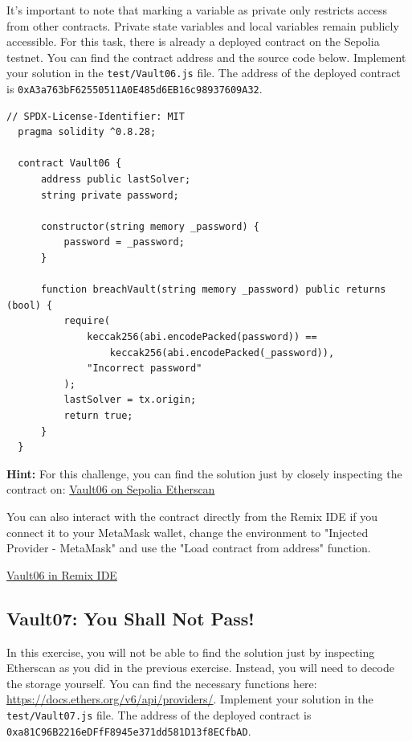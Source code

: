 \documentclass[12pt]{article}
\begin{document}
\noindent
It's important to note that marking a variable as private only restricts access from other contracts. Private state variables and local variables remain publicly accessible. For this task, there is already a deployed contract on the Sepolia testnet. You can find the contract address and the source code below. Implement your solution in the \texttt{test/Vault06.js} file. The address of the deployed contract is \texttt{0xA3a763bF62550511A0E485d6EB16c98937609A32}.

\begin{lstlisting}[language=Solidity]
  // SPDX-License-Identifier: MIT
  pragma solidity ^0.8.28;
  
  contract Vault06 {
      address public lastSolver;
      string private password;
  
      constructor(string memory _password) {
          password = _password;
      }
  
      function breachVault(string memory _password) public returns (bool) {
          require(
              keccak256(abi.encodePacked(password)) ==
                  keccak256(abi.encodePacked(_password)),
              "Incorrect password"
          );
          lastSolver = tx.origin;
          return true;
      }
  }
\end{lstlisting}

\medskip
\noindent
\textbf{Hint:} For this challenge, you can find the solution just by closely inspecting the contract on: \href{https://sepolia.etherscan.io/address/0xA3a763bF62550511A0E485d6EB16c98937609A32}{Vault06 on Sepolia Etherscan}

\medskip
\noindent
You can also interact with the contract directly from the Remix IDE if you connect it to your MetaMask wallet, change the environment to "Injected Provider - MetaMask" and use the "Load contract from address" function.

\medskip
\noindent
\href{https://remix.ethereum.org/?#activate=solidity&url=https://github.com/radovluk/unbreakable-vault/contracts/Vault06.sol&lang=en&optimize=false&runs=200&evmVersion=null&version=soljson-v0.8.28+commit.7893614a.js}{Vault06 in Remix IDE}

\subsection*{Vault07: You Shall Not Pass!}

\noindent
In this exercise, you will not be able to find the solution just by inspecting Etherscan as you did in the previous exercise. Instead, you will need to decode the storage yourself. You can find the necessary functions here: \href{https://docs.ethers.org/v6/api/providers/}{https://docs.ethers.org/v6/api/providers/}. Implement your solution in the \texttt{test/Vault07.js} file. The address of the deployed contract is \texttt{0xa81C96B2216eDFfF8945e371dd581D13f8ECfbAD}.
\end{document}
